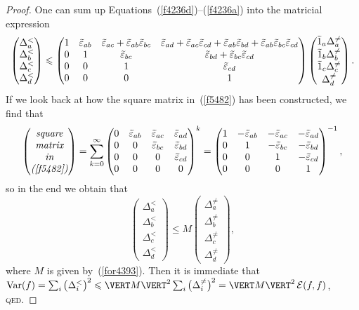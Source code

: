 \begin{proof}
One can sum up Equations~(\ref{f4236d})--(\ref{f4236a}) into the matricial expression
\[\label{f5482}
\begin{pmatrix} \Delta_a^< \\ \Delta_b^< \\ \Delta_c^< \\ \Delta_d^< \end{pmatrix} \leq
\begin{pmatrix} 1 & \teps_{ab} & \teps_{ac} + \teps_{ab}\teps_{bc} &
\teps_{ad} + \teps_{ac}\teps_{cd} + \teps_{ab}\teps_{bd} + \teps_{ab}\teps_{bc}\teps_{cd} \\
0 & 1 & \teps_{bc} & \teps_{bd} + \teps_{bc}\teps_{cd} \\
0 & 0 & 1 & \teps_{cd} \\
0 & 0 & 0 & 1 \end{pmatrix}
\begin{pmatrix} \tilde1_a \Delta^{\neq}_a \\ \tilde1_b \Delta^{\neq}_b \\
\tilde1_c \Delta^{\neq}_c \\ \Delta^{\neq}_d \end{pmatrix} .\]
%
If we look back at how the square matrix in~(\ref{f5482}) has been constructed,
we find that
\[ \begin{pmatrix}
\text{\it square} \\
\text{\it matrix} \\
\text{\it in} \\
\text{\it (\ref{f5482})} \\
\end{pmatrix} =
\sum_{k=0}^{\infty} \begin{pmatrix}
0 & \teps_{ab} & \teps_{ac} & \teps_{ad} \\
0 & 0 & \teps_{bc} & \teps_{bd} \\
0 & 0 & 0 & \teps_{cd} \\
0 & 0 & 0 & 0 \end{pmatrix}^{k}
= \begin{pmatrix}
1 & -\teps_{ab} & -\teps_{ac} & -\teps_{ad} \\
0 & 1 & -\teps_{bc} & -\teps_{bd} \\
0 & 0 & 1 & -\teps_{cd} \\
0 & 0 & 0 & 1 \end{pmatrix}^{-1} ,\]
%
so in the end we obtain that
\[ \begin{pmatrix} \Delta_a^< \\ \Delta_b^< \\ \Delta_c^< \\ \Delta_d^< \end{pmatrix} \leq
M \begin{pmatrix} \Delta^{\neq}_a \\ \Delta^{\neq}_b \\ \Delta^{\neq}_c \\ \Delta^{\neq}_d
\end{pmatrix} ,\]
where $M$ is given by~(\ref{for4393}).
Then it is immediate that $\Var(f) = \sum_i \big(\Delta_i^<\big)^2 \leq
\VERT M \VERT^2 \sum_i \big(\Delta_i^{\neq}\big)^2 = \VERT M \VERT^{2} \,\mcal{E}(f,f)$, \textsc{qed}.
\end{proof}

